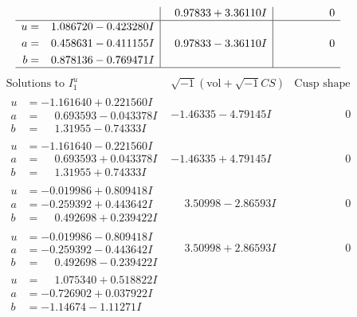 \documentclass[1p]{elsarticle_modified}
\theoremstyle{definition}
\newcommand{\I}{\sqrt{-1}}
\begin{document}
$$\begin{array}{c|c|c}
 & \phantom{-}0.97833 + 3.36110 I & \phantom{-0.000000 } 0 \\ \hline\begin{aligned}
u &= \phantom{-}1.086720 - 0.423280 I \\
a &= \phantom{-}0.458631 - 0.411155 I \\
b &= \phantom{-}0.878136 - 0.769471 I\end{aligned}
 & \phantom{-}0.97833 - 3.36110 I & \phantom{-0.000000 } 0\\
 \hline 
 \end{array}$$\newpage$$\begin{array}{c|c|c}  
\text{Solutions to }I^u_{1}& \I (\text{vol} + \sqrt{-1}CS) & \text{Cusp shape}\\
 \hline 
\begin{aligned}
u &= -1.161640 + 0.221560 I \\
a &= \phantom{-}0.693593 - 0.043378 I \\
b &= \phantom{-}1.31955 - 0.74333 I\end{aligned}
 & -1.46335 - 4.79145 I & \phantom{-0.000000 } 0 \\ \hline\begin{aligned}
u &= -1.161640 - 0.221560 I \\
a &= \phantom{-}0.693593 + 0.043378 I \\
b &= \phantom{-}1.31955 + 0.74333 I\end{aligned}
 & -1.46335 + 4.79145 I & \phantom{-0.000000 } 0 \\ \hline\begin{aligned}
u &= -0.019986 + 0.809418 I \\
a &= -0.259392 + 0.443642 I \\
b &= \phantom{-}0.492698 + 0.239422 I\end{aligned}
 & \phantom{-}3.50998 - 2.86593 I & \phantom{-0.000000 } 0 \\ \hline\begin{aligned}
u &= -0.019986 - 0.809418 I \\
a &= -0.259392 - 0.443642 I \\
b &= \phantom{-}0.492698 - 0.239422 I\end{aligned}
 & \phantom{-}3.50998 + 2.86593 I & \phantom{-0.000000 } 0 \\ \hline\begin{aligned}
u &= \phantom{-}1.075340 + 0.518822 I \\
a &= -0.726902 + 0.037922 I \\
b &= -1.14674 - 1.11271 I\end{aligned}

\end{array}$$
\end{document}
